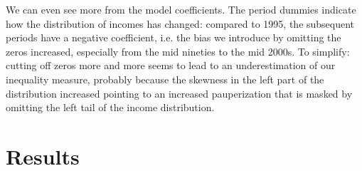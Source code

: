 \documentclass[twoside]{article}\usepackage[]{graphicx}\usepackage[]{color}
\begin{document}
\begin{multicols}{2}
We can even see more from the model coefficients. The period dummies indicate how the distribution of incomes has changed: compared to 1995, the subsequent periods have a negative coefficient, i.e. the bias we introduce by omitting the zeros increased, especially from the mid nineties to the mid 2000s. To simplify: cutting off zeros more and more seems to lead to an underestimation of our inequality measure, probably because the skewness in the left part of the distribution increased pointing to an increased pauperization that is masked by omitting the left tail of the income distribution.















\section{Results}


\end{multicols}
\end{document}
